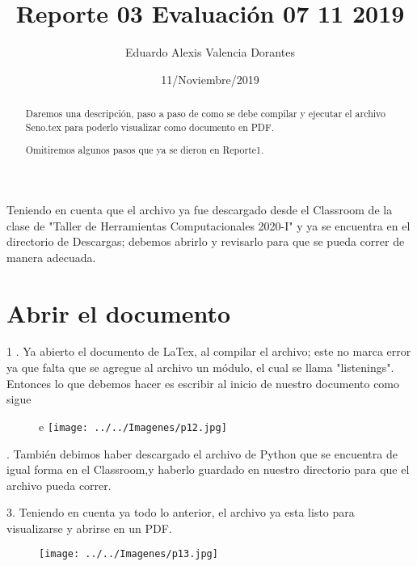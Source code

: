 \documentclass[letter,12pt]{article}
\title{Reporte 03 Evaluación 07 11 2019}
\author{Eduardo Alexis Valencia Dorantes}
\date{11/Noviembre/2019}
\begin{document}
	

\begin{abstract}
Daremos una descripción, paso a paso de como se debe compilar y ejecutar el archivo Seno.tex para poderlo visualizar como documento en PDF.

Omitiremos algunos pasos que ya se dieron en Reporte1.
\end{abstract}

Teniendo en cuenta que el archivo ya fue descargado desde el Classroom de la clase de "Taller de Herramientas Computacionales 2020-I" y ya se encuentra en el directorio de Descargas; debemos abrirlo y revisarlo para que se pueda correr de manera adecuada.

\section*{Abrir el documento}

1 . Ya abierto el documento de LaTex, al compilar el archivo; este no marca error ya que falta que se agregue al archivo un módulo, el cual se llama "listenings".
Entonces lo que debemos hacer es escribir al inicio de nuestro documento como sigue

\begin{figure}[h]
	\centering
e	\texttt{[image: ../../Imagenes/p12.jpg]}
	\caption{}
	\label{fig:p12}
\end{figure}

. También debimos haber descargado el archivo de Python que se encuentra de igual forma en el Classroom,y  haberlo guardado en nuestro directorio para que el archivo pueda correr.

3. Teniendo en cuenta ya todo lo anterior, el archivo ya esta listo para visualizarse y abrirse en un PDF.

\begin{figure}[h]
	\centering
	\texttt{[image: ../../Imagenes/p13.jpg]}
	\caption{}
	\label{fig:p13}
\end{figure}
\end{document}
